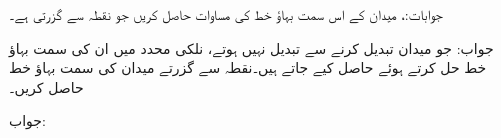 جوابات:، 
میدان  کے اس سمت بہاؤ خط کی مساوات حاصل کریں جو نقطہ  سے گزرتی ہے۔

جواب:
جو میدان  تبدیل کرنے سے تبدیل نہیں ہوتے، نلکی محدد میں ان کی سمت بہاؤ خط  حل کرتے ہوئے حاصل کیے جاتے ہیں۔نقطہ  سے گزرتے  میدان  کی سمت بہاؤ خط حاصل کریں۔

جواب:
